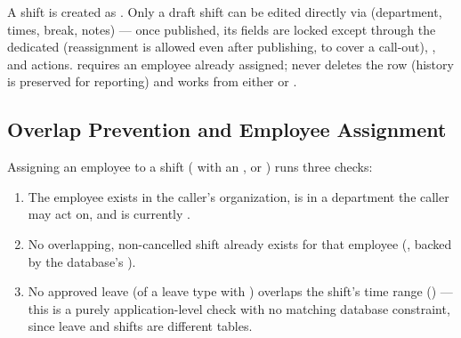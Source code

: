 \begin{center}
\end{center}

A shift is created as . Only a draft shift can be edited
directly via  (department, times, break, notes) ---
once published, its fields are locked except through the dedicated
 (reassignment is allowed even after publishing,
to cover a call-out), , and 
actions.  requires an employee already assigned;
 never deletes the row (history is preserved for
reporting) and works from either  or .

\subsection*{Overlap Prevention and Employee Assignment}

Assigning an employee to a shift ( with an
, or ) runs three checks:

\begin{enumerate}[nosep]
  \item The employee exists in the caller's organization, is in a
        department the caller may act on, and is currently
        .
  \item No overlapping, non-cancelled shift already exists for that
        employee (, backed by
        the database's ).
  \item No approved leave (of a leave type with
        ) overlaps the shift's time
        range () ---
        this is a purely application-level check with no matching
        database constraint, since leave and shifts are different
        tables.
\end{enumerate}

